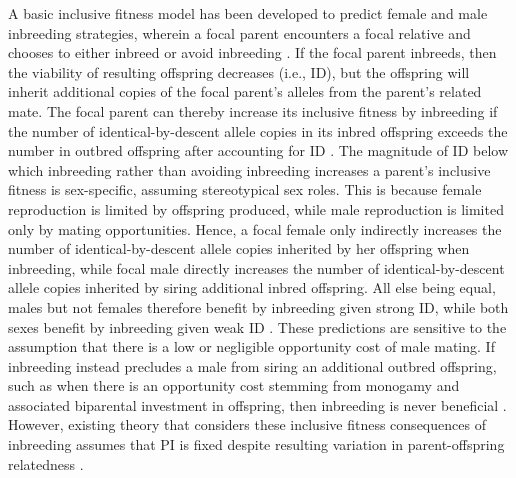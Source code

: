 \documentclass[12pt]{article}
\begin{document}
A basic inclusive fitness model has been developed to predict female and male inbreeding strategies, wherein a focal parent encounters a focal relative and chooses to either inbreed or avoid inbreeding \cite[][]{Parker1979, Parker2006, Kokko2006, Duthie2015a}. If the focal parent inbreeds, then the viability of resulting offspring decreases (i.e., ID), but the offspring will inherit additional copies of the focal parent's alleles from the parent's related mate. The focal parent can thereby increase its inclusive fitness by inbreeding if the number of identical-by-descent allele copies in its inbred offspring exceeds the number in outbred offspring after accounting for ID \cite[][]{Parker1979, Parker2006, Kokko2006, Szulkin2012, Duthie2015a}. The magnitude of ID below which inbreeding rather than avoiding inbreeding increases a parent's inclusive fitness is sex-specific, assuming stereotypical sex roles. This is because female reproduction is limited by offspring produced, while male reproduction is limited only by mating opportunities. Hence, a focal female only indirectly increases the number of identical-by-descent allele copies inherited by her offspring when inbreeding, while focal male directly increases the number of identical-by-descent allele copies inherited by siring additional inbred offspring. All else being equal, males but not females therefore benefit by inbreeding given strong ID, while both sexes benefit by inbreeding given weak ID \cite[][]{Parker1979, Parker2006, Kokko2006, Duthie2015a}. These predictions are sensitive to the assumption that there is a low or negligible opportunity cost of male mating. If inbreeding instead precludes a male from siring an additional outbred offspring, such as when there is an opportunity cost stemming from monogamy and associated biparental investment in offspring, then inbreeding is never beneficial \cite[][]{Waser1986}. However, existing theory that considers these inclusive fitness consequences of inbreeding assumes that PI is fixed despite resulting variation in parent-offspring relatedness \cite[][]{Trivers1974, Lynch1998, Reid2016}. 
\end{document}
